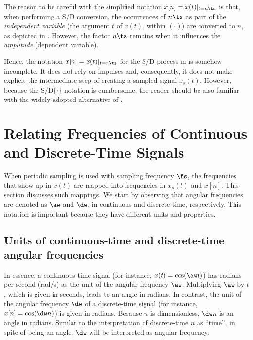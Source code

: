 The reason to be careful with the simplified notation $x[n] = x(t)|_{t=n \ts}$ is that, when performing a S/D conversion, the
occurrences of $n\ts$ as part of the \emph{independent variable} (the argument $t$ of $x(t)$, within $(\cdot)$) are converted to $n$, as depicted in 
. However, the factor $n \ts$ remains when it influences the \emph{amplitude}
(dependent variable).


Hence, the notation $x[n]=x(t)|_{t=n \ts}$ for the S/D process in  is somehow incomplete. It does not rely on impulses and, consequently, it does not make explicit the intermediate
step of creating a sampled signal $x_s(t)$.
However, because the $\textrm{S/D} \{ \cdot \}$ notation is cumbersome, the reader should be
also familiar with the widely adopted alternative of .
\eExample


\section{Relating Frequencies of Continuous and Discrete-Time Signals}
\label{sec:relatingContinuousDiscrete}

When periodic sampling is used
with sampling frequency $\fs$, the frequencies 
that show up in $x(t)$ are mapped into frequencies in $x_s(t)$ and $x[n]$.
This section discusses such mappings. We start by observing that angular frequencies
are denoted as $\aw$ and $\dw$, in continuous and discrete-time, respectively.
This notation is important because they have different units and properties.

\subsection{Units of continuous-time and discrete-time angular frequencies}

In essence, a continuous-time signal (for instance, $x(t)=\cos(\aw t)$) has radians per second (rad/s) as the unit of the angular frequency $\aw$. Multiplying $\aw$ by $t$, which is given in seconds, leads to an angle in radians. In contrast, the unit of the angular frequency $\dw$ of a discrete-time signal (for instance, $x[n]=\cos(\dw n)$) is given in radians. Because $n$ is dimensionless, $\dw n$ is an angle in radians. Similar to the interpretation of discrete-time $n$ as ``time'', in spite of being an angle, $\dw$ will be interpreted as angular frequency.

